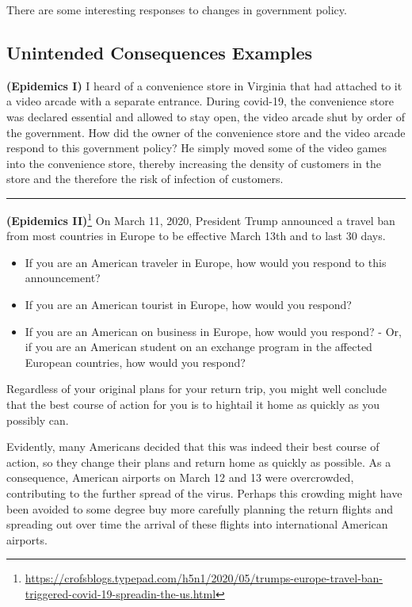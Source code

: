 \documentclass[
]{book}
\providecommand{\tightlist}{%
  \setlength{\itemsep}{0pt}\setlength{\parskip}{0pt}}
\begin{document}
There are some interesting responses to changes in government policy.

\hypertarget{unintended-consequences-examples}{%
\subsection{Unintended Consequences Examples}\label{unintended-consequences-examples}}

\textbf{(Epidemics I)} I heard of a convenience store in Virginia that had attached to it a video arcade with a separate entrance. During covid-19, the convenience store was declared essential and allowed to stay open, the video arcade shut by order of the government. How did the owner of the convenience store and the video arcade respond to this government policy? He simply moved some of the video games into the convenience store, thereby increasing the density of customers in the store and the therefore the risk of infection of customers.

\begin{center}\rule{0.5\linewidth}{0.5pt}\end{center}

\textbf{(Epidemics II)}\footnote{\url{https://crofsblogs.typepad.com/h5n1/2020/05/trumps-europe-travel-ban-triggered-covid-19-spreadin-the-us.html}} On March 11, 2020, President Trump announced a travel ban from most countries in Europe to be effective March 13th and to last 30 days.

\begin{itemize}
\tightlist
\item
  If you are an American traveler in Europe, how would you respond to this announcement?
\item
  If you are an American tourist in Europe, how would you respond?
\item
  If you are an American on business in Europe, how would you respond? - Or, if you are an American student on an exchange program in the affected European countries, how would you respond?
\end{itemize}

Regardless of your original plans for your return trip, you might well conclude that the best course of action for you is to hightail it home as quickly as you possibly can.

Evidently, many Americans decided that this was indeed their best course of action, so they change their plans and return home as quickly as possible. As a consequence, American airports on March 12 and 13 were overcrowded, contributing to the further spread of the virus. Perhaps this crowding might have been avoided to some degree buy more carefully planning the return flights and spreading out over time the arrival of these flights into international American airports.
\end{document}
